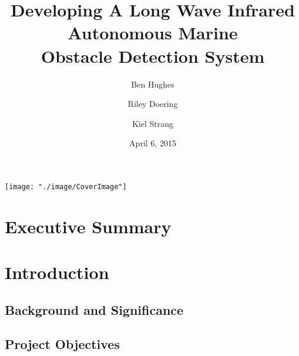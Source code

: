 \documentclass[twocolumn, amsmath, amssymb, aps, pra, 12pt, floatfix, showpacs]{revtex4-1}
\begin{document}
\title{Developing A Long Wave Infrared\\ Autonomous Marine\\ Obstacle Detection System}
\author{Ben Hughes}
\author{Riley Doering}
\author{Kiel Strang}
\noaffiliation
\date{April 6, 2015}
\maketitle

\onecolumngrid
\begin{center}
  \texttt{[image: "./image/CoverImage"]}
 \label{fig:CoverImage}
\end{center}


\newpage
{}

\section*{Executive Summary}


\newpage
\tableofcontents

\makeatletter
\let\toc@pre\relax
\let\toc@post\relax
\makeatother 

\newpage
\listoffigures
\listoftables

\clearpage
\newpage
{}


\section{\label{sec:introduction}Introduction}


\subsection{\label{sec:introduction:backgroundandsignificance}Background and Significance}


\subsection{\label{sec:introduction:projectobjectives}Project Objectives}

\end{document}
